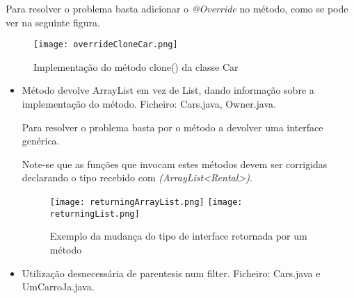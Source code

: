 \begin{itemize}
\begin{itemize}
\par Para resolver o problema basta adicionar o \textit{@Override} no método, como se pode ver na seguinte figura.\newline

\begin{figure}[H]

  \centering

  \texttt{[image: overrideCloneCar.png]}


  \caption {Implementação do método clone() da classe Car}

  \label {fig14}

\end{figure}

\end{itemize}


\begin{itemize}
\item Método devolve ArrayList em vez de List, dando informação sobre a implementação do método.\newline
 Ficheiro: Cars.java, Owner.java.\newline


\par Para resolver o problema basta por o método a devolver uma interface genérica.\newline
\par Note-se que as funções que invocam estes métodos devem ser corrigidas declarando o tipo recebido com \textit{(ArrayList<Rental>)}.

\begin{figure}[H]

  \centering

  \texttt{[image: returningArrayList.png]}
  \texttt{[image: returningList.png]}

  \caption {Exemplo da mudança do tipo de interface retornada por um método}

  \label {fig15}

\end{figure}

\end{itemize}

\begin{itemize}
\item Utilização desnecessária de parentesis num filter.\newline
 Ficheiro: Cars.java e UmCarroJa.java.\newline


\begin{figure}[H]


\end{figure}
\end{itemize}
\end{itemize}
